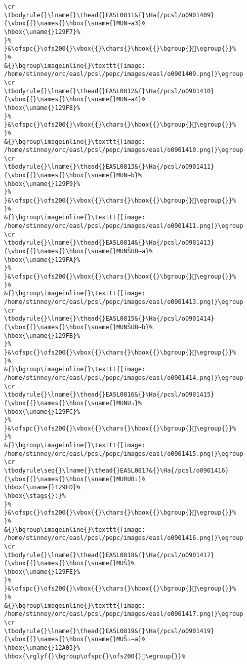\begin{verbatim}
\cr
\tbodyrule{}\lname{}\thead{}EASL0811&{}\Ha{/pcsl/o0901409}{\vbox{{}\names{}\hbox{\sname{}MUN∼a3}%
\hbox{\uname{}129F7}%
}%
}&\ofspc{}\ofs200{}\vbox{{}\chars{}\hbox{{}\bgroup{}𒧷\egroup{}}%
}%
&{}\bgroup\imageinline{}\texttt{[image: /home/stinney/orc/easl/pcsl/pepc/images/easl/o0901409.png]}\egroup
\cr
\tbodyrule{}\lname{}\thead{}EASL0812&{}\Ha{/pcsl/o0901410}{\vbox{{}\names{}\hbox{\sname{}MUN∼a4}%
\hbox{\uname{}129F8}%
}%
}&\ofspc{}\ofs200{}\vbox{{}\chars{}\hbox{{}\bgroup{}𒧸\egroup{}}%
}%
&{}\bgroup\imageinline{}\texttt{[image: /home/stinney/orc/easl/pcsl/pepc/images/easl/o0901410.png]}\egroup
\cr
\tbodyrule{}\lname{}\thead{}EASL0813&{}\Ha{/pcsl/o0901411}{\vbox{{}\names{}\hbox{\sname{}MUN∼b}%
\hbox{\uname{}129F9}%
}%
}&\ofspc{}\ofs200{}\vbox{{}\chars{}\hbox{{}\bgroup{}𒧹\egroup{}}%
}%
&{}\bgroup\imageinline{}\texttt{[image: /home/stinney/orc/easl/pcsl/pepc/images/easl/o0901411.png]}\egroup
\cr
\tbodyrule{}\lname{}\thead{}EASL0814&{}\Ha{/pcsl/o0901413}{\vbox{{}\names{}\hbox{\sname{}MUNŠUB∼a}%
\hbox{\uname{}129FA}%
}%
}&\ofspc{}\ofs200{}\vbox{{}\chars{}\hbox{{}\bgroup{}𒧺\egroup{}}%
}%
&{}\bgroup\imageinline{}\texttt{[image: /home/stinney/orc/easl/pcsl/pepc/images/easl/o0901413.png]}\egroup
\cr
\tbodyrule{}\lname{}\thead{}EASL0815&{}\Ha{/pcsl/o0901414}{\vbox{{}\names{}\hbox{\sname{}MUNŠUB∼b}%
\hbox{\uname{}129FB}%
}%
}&\ofspc{}\ofs200{}\vbox{{}\chars{}\hbox{{}\bgroup{}𒧻\egroup{}}%
}%
&{}\bgroup\imageinline{}\texttt{[image: /home/stinney/orc/easl/pcsl/pepc/images/easl/o0901414.png]}\egroup
\cr
\tbodyrule{}\lname{}\thead{}EASL0816&{}\Ha{/pcsl/o0901415}{\vbox{{}\names{}\hbox{\sname{}MUNU₃}%
\hbox{\uname{}129FC}%
}%
}&\ofspc{}\ofs200{}\vbox{{}\chars{}\hbox{{}\bgroup{}𒧼\egroup{}}%
}%
&{}\bgroup\imageinline{}\texttt{[image: /home/stinney/orc/easl/pcsl/pepc/images/easl/o0901415.png]}\egroup
\cr
\tbodyrule\seq{}\lname{}\thead{}EASL0817&{}\Ha{/pcsl/o0901416}{\vbox{{}\names{}\hbox{\sname{}MURUB₂}%
\hbox{\uname{}129FD}%
\hbox{\stags{}:}%
}%
}&\ofspc{}\ofs200{}\vbox{{}\chars{}\hbox{{}\bgroup{}𒧽\egroup{}}%
}%
&{}\bgroup\imageinline{}\texttt{[image: /home/stinney/orc/easl/pcsl/pepc/images/easl/o0901416.png]}\egroup
\cr
\tbodyrule{}\lname{}\thead{}EASL0818&{}\Ha{/pcsl/o0901417}{\vbox{{}\names{}\hbox{\sname{}MUŠ}%
\hbox{\uname{}129FE}%
}%
}&\ofspc{}\ofs200{}\vbox{{}\chars{}\hbox{{}\bgroup{}𒧾\egroup{}}%
}%
&{}\bgroup\imageinline{}\texttt{[image: /home/stinney/orc/easl/pcsl/pepc/images/easl/o0901417.png]}\egroup
\cr
\tbodyrule{}\lname{}\thead{}EASL0819&{}\Ha{/pcsl/o0901419}{\vbox{{}\names{}\hbox{\sname{}MUŠ₃∼a}%
\hbox{\uname{}12A03}%
\hbox{\rglyf{}\bgroup\ofspc{}\ofs200{}𒨃\egroup{}}%

\end{verbatim}
